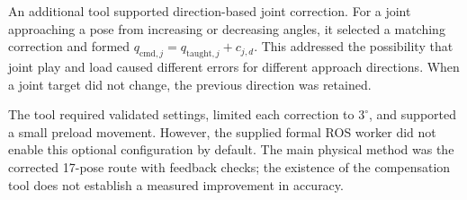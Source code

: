 An additional tool supported direction-based joint correction. For a joint approaching a pose from increasing or decreasing angles, it selected a matching correction and formed $q_{\mathrm{cmd},j}=q_{\mathrm{taught},j}+c_{j,d}$. This addressed the possibility that joint play and load caused different errors for different approach directions. When a joint target did not change, the previous direction was retained.

The tool required validated settings, limited each correction to $3^{\circ}$, and supported a small preload movement. However, the supplied formal ROS worker did not enable this optional configuration by default. The main physical method was the corrected 17-pose route with feedback checks; the existence of the compensation tool does not establish a measured improvement in accuracy.

